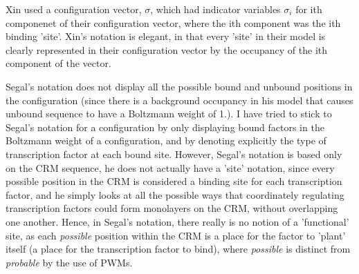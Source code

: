   Xin used a configuration vector, $\sigma$, which had indicator variables $\sigma_i$ for ith componenet of their configuration vector, where the ith component was the ith binding 'site'.  Xin's notation is elegant, in that every 'site' in their model is clearly represented in their configuration vector by the occupancy of the ith component of the vector.  
  
  Segal's notation does not display all the possible bound and unbound positions in the configuration (since there is a background occupancy in his model that causes unbound sequence to have a Boltzmann weight of 1.).  I have tried to stick to Segal's notation for a configuration by only displaying bound factors in the Boltzmann weight of a configuration, and by denoting explicitly the type of transcription factor at each bound site.  However, Segal's notation is based only on the CRM sequence, he does not actually have a 'site' notation, since every possible position in the CRM is considered a binding site for each transcription factor, and he simply looks at all the possible ways that coordinately regulating transcription factors could form monolayers on the CRM, without overlapping one another.  Hence, in Segal's notation, there really is no notion of a 'functional' site, as each \textit{possible} position within the CRM is a place for the factor to 'plant' itself (a place for the transcription factor to bind), where \textit{possible} is distinct from \textit{probable} by the use of PWMs.   
   
